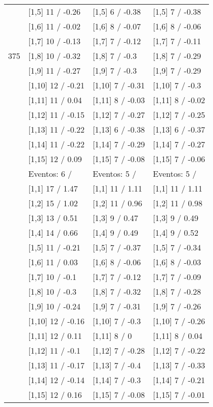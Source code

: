 \begin{table}
\begin{tabular}[t]{llll}
 & {}[1,5] 11  / -0.26 & {}[1,5] 6  / -0.38 & {}[1,5] 7  / -0.38\\
 & {}[1,6] 11  / -0.02 & {}[1,6] 8  / -0.07 & {}[1,6] 8  / -0.06\\
 & {}[1,7] 10  / -0.13 & {}[1,7] 7  / -0.12 & {}[1,7] 7  / -0.11\\
375 & {}[1,8] 10  / -0.32 & {}[1,8] 7  / -0.3 & {}[1,8] 7  / -0.29\\
\addlinespace
 & {}[1,9] 11  / -0.27 & {}[1,9] 7  / -0.3 & {}[1,9] 7  / -0.29\\
 & {}[1,10] 12  / -0.21 & {}[1,10] 7  / -0.31 & {}[1,10] 7  / -0.3\\
 & {}[1,11] 11  / 0.04 & {}[1,11] 8  / -0.03 & {}[1,11] 8  / -0.02\\
 & {}[1,12] 11  / -0.15 & {}[1,12] 7  / -0.27 & {}[1,12] 7  / -0.25\\
 & {}[1,13] 11  / -0.22 & {}[1,13] 6  / -0.38 & {}[1,13] 6  / -0.37\\
\addlinespace
 & {}[1,14] 11  / -0.22 & {}[1,14] 7  / -0.29 & {}[1,14] 7  / -0.27\\
 & {}[1,15] 12  / 0.09 & {}[1,15] 7  / -0.08 & {}[1,15] 7  / -0.06\\
 & Eventos:  6 / & Eventos:  5 / & Eventos:  5 /\\
 & {}[1,1] 17  / 1.47 & {}[1,1] 11  / 1.11 & {}[1,1] 11  / 1.11\\
 & {}[1,2] 15  / 1.02 & {}[1,2] 11  / 0.96 & {}[1,2] 11  / 0.98\\
\addlinespace
 & {}[1,3] 13  / 0.51 & {}[1,3] 9  / 0.47 & {}[1,3] 9  / 0.49\\
 & {}[1,4] 14  / 0.66 & {}[1,4] 9  / 0.49 & {}[1,4] 9  / 0.52\\
 & {}[1,5] 11  / -0.21 & {}[1,5] 7  / -0.37 & {}[1,5] 7  / -0.34\\
 & {}[1,6] 11  / 0.03 & {}[1,6] 8  / -0.06 & {}[1,6] 8  / -0.03\\
 & {}[1,7] 10  / -0.1 & {}[1,7] 7  / -0.12 & {}[1,7] 7  / -0.09\\
\addlinespace
500 & {}[1,8] 10  / -0.3 & {}[1,8] 7  / -0.32 & {}[1,8] 7  / -0.28\\
 & {}[1,9] 10  / -0.24 & {}[1,9] 7  / -0.31 & {}[1,9] 7  / -0.26\\
 & {}[1,10] 12  / -0.16 & {}[1,10] 7  / -0.3 & {}[1,10] 7  / -0.26\\
 & {}[1,11] 12  / 0.11 & {}[1,11] 8  / 0 & {}[1,11] 8  / 0.04\\
 & {}[1,12] 11  / -0.1 & {}[1,12] 7  / -0.28 & {}[1,12] 7  / -0.22\\
\addlinespace
 & {}[1,13] 11  / -0.17 & {}[1,13] 7  / -0.4 & {}[1,13] 7  / -0.33\\
 & {}[1,14] 12  / -0.14 & {}[1,14] 7  / -0.3 & {}[1,14] 7  / -0.21\\
 & {}[1,15] 12  / 0.16 & {}[1,15] 7  / -0.08 & {}[1,15] 7  / -0.01\\
\bottomrule
\end{tabular}
\end{table}
